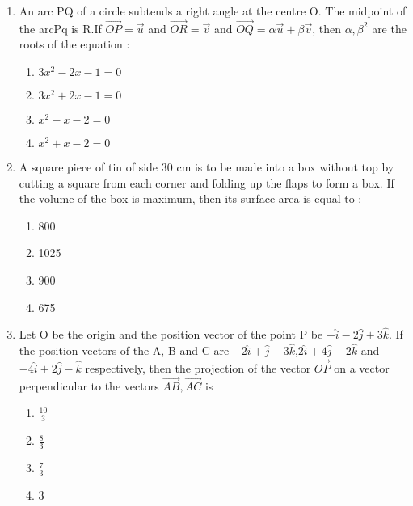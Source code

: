 \documentclass[journal]{IEEEtran}
\begin{document}
\begin{enumerate}
\setcounter{enumi}{0}
 
    \item An arc PQ of a circle subtends a right angle at the centre O. The midpoint of the arcPq is R.If $\overrightarrow{OP}=\overrightarrow{u}$ and $\overrightarrow{OR}=\overrightarrow{v}$ and $\overrightarrow{OQ}=\alpha \overrightarrow{u}+\beta \overrightarrow{v}$, then $\alpha, \beta^2$ are the roots of the equation :
        \begin{multicols}{1}
            \begin{enumerate}
                \item $3x^2-2x-1=0$
                \item $3x^2+2x-1=0$
                \item $x^2-x-2=0$
                \item $x^2+x-2=0$
            \end{enumerate}
        \end{multicols}

    \item A square piece of tin of side 30 cm is to be made into a box without top by cutting a square from each corner
and folding up the flaps to form a box. If the volume of the box is maximum, then its surface area  is
equal to :

		\begin{multicols}{4}
			\begin{enumerate}
				\item 800
				\item  1025
				\item  900
				\item  675
			\end{enumerate}
		\end{multicols}

    \item Let O be the origin and the position vector of the point P be $-\hat{i}-2\hat{j}+3\hat{k}.$ If the position vectors of the A, B
and C are $-2\hat{i}+\hat{j}-3\hat{k}$,$2\hat{i}+4\hat{j}-2\hat{k}$ and $-4\hat{i}+2\hat{j}-\hat{k}$ respectively, then the projection of the vector $\overrightarrow{OP}$ on a vector perpendicular to the vectors $\overrightarrow{AB},\overrightarrow{AC}$ is 
        \begin{multicols}{4}
            \begin{enumerate}
              \item $\frac{10}{3}$
              \item $\frac{8}{3}$
              \item $\frac{7}{3}$
              \item $3$
            \end{enumerate}
        \end{multicols}


\end{enumerate}
\end{document}
